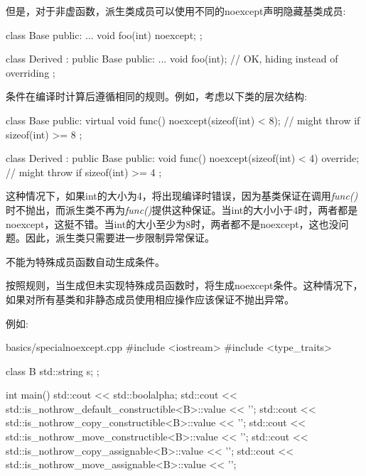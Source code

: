 但是，对于非虚函数，派生类成员可以使用不同的noexcept声明隐藏基类成员:\par

\begin{codebox}[cpp]
class Base {
  public:
  ...
  void foo(int) noexcept;
};

class Derived : public Base {
  public:
  ...
  void foo(int); // OK, hiding instead of overriding
};
\end{codebox}

条件在编译时计算后遵循相同的规则。例如，考虑以下类的层次结构:\par

\begin{codebox}[cpp]
class Base {
  public:
  virtual void func() noexcept(sizeof(int) < 8); // might throw if sizeof(int) >= 8
};

class Derived : public Base {
  public:
  void func() noexcept(sizeof(int) < 4) override; // might throw if sizeof(int) >= 4
};
\end{codebox}

这种情况下，如果int的大小为4，将出现编译时错误，因为基类保证在调用\textit{func()}时不抛出，而派生类不再为\textit{func()}提供这种保证。当int的大小小于4时，两者都是noexcept，这挺不错。当int的大小至少为8时，两者都不是noexcept，这也没问题。因此，派生类只需要进一步限制异常保证。\par


不能为特殊成员函数自动生成条件。\par


按照规则，当生成但未实现特殊成员函数时，将生成noexcept条件。这种情况下，如果对所有基类和非静态成员使用相应操作应该保证不抛出异常。\par

例如:\par

\begin{codeboxt}[cpp]{basics/specialnoexcept.cpp}
#include <iostream>
#include <type_traits>

class B
{
  std::string s;
};

int main()
{
  std::cout << std::boolalpha;
  std::cout << std::is_nothrow_default_constructible<B>::value << '\n';
  std::cout << std::is_nothrow_copy_constructible<B>::value << '\n';
  std::cout << std::is_nothrow_move_constructible<B>::value << '\n';
  std::cout << std::is_nothrow_copy_assignable<B>::value << '\n';
  std::cout << std::is_nothrow_move_assignable<B>::value << '\n';
}
\end{codeboxt}

